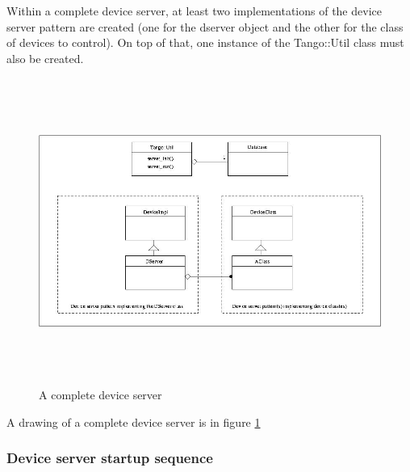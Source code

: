 Within a complete device server, at least two implementations of the
device server pattern are created (one for the dserver object and
the other for the class of devices to control). On top of that, one
instance of the Tango::Util class must also be created.
\begin{figure}
\begin{centering}
\includegraphics[width=14cm,height=10cm]{ds_writing/complete_server}
\par\end{centering}

\protect\caption{A complete device server\label{completeDS}}
\end{figure}
 A drawing of a complete device server is in figure \ref{completeDS}


\subsubsection{Device server startup sequence\label{Server_startup}}

